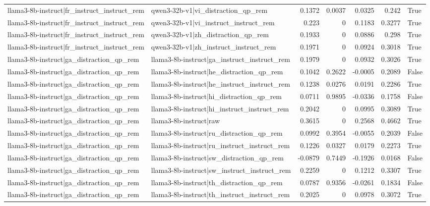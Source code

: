 \begin{table}
\begin{tabular}{l l r r r r l}
llama3-8b-instruct|fr_instruct_instruct_rem & qwen3-32b-v1|vi_distraction_qp_rem & 0.1372 & 0.0037 & 0.0325 & 0.242 & True \\
llama3-8b-instruct|fr_instruct_instruct_rem & qwen3-32b-v1|vi_instruct_instruct_rem & 0.223 & 0 & 0.1183 & 0.3277 & True \\
llama3-8b-instruct|fr_instruct_instruct_rem & qwen3-32b-v1|zh_distraction_qp_rem & 0.1933 & 0 & 0.0886 & 0.298 & True \\
llama3-8b-instruct|fr_instruct_instruct_rem & qwen3-32b-v1|zh_instruct_instruct_rem & 0.1971 & 0 & 0.0924 & 0.3018 & True \\
llama3-8b-instruct|ga_distraction_qp_rem & llama3-8b-instruct|ga_instruct_instruct_rem & 0.1979 & 0 & 0.0932 & 0.3026 & True \\
llama3-8b-instruct|ga_distraction_qp_rem & llama3-8b-instruct|he_distraction_qp_rem & 0.1042 & 0.2622 & -0.0005 & 0.2089 & False \\
llama3-8b-instruct|ga_distraction_qp_rem & llama3-8b-instruct|he_instruct_instruct_rem & 0.1238 & 0.0276 & 0.0191 & 0.2286 & True \\
llama3-8b-instruct|ga_distraction_qp_rem & llama3-8b-instruct|hi_distraction_qp_rem & 0.0711 & 0.9895 & -0.0336 & 0.1758 & False \\
llama3-8b-instruct|ga_distraction_qp_rem & llama3-8b-instruct|hi_instruct_instruct_rem & 0.2042 & 0 & 0.0995 & 0.3089 & True \\
llama3-8b-instruct|ga_distraction_qp_rem & llama3-8b-instruct|raw & 0.3615 & 0 & 0.2568 & 0.4662 & True \\
llama3-8b-instruct|ga_distraction_qp_rem & llama3-8b-instruct|ru_distraction_qp_rem & 0.0992 & 0.3954 & -0.0055 & 0.2039 & False \\
llama3-8b-instruct|ga_distraction_qp_rem & llama3-8b-instruct|ru_instruct_instruct_rem & 0.1226 & 0.0327 & 0.0179 & 0.2273 & True \\
llama3-8b-instruct|ga_distraction_qp_rem & llama3-8b-instruct|sw_distraction_qp_rem & -0.0879 & 0.7449 & -0.1926 & 0.0168 & False \\
llama3-8b-instruct|ga_distraction_qp_rem & llama3-8b-instruct|sw_instruct_instruct_rem & 0.2259 & 0 & 0.1212 & 0.3307 & True \\
llama3-8b-instruct|ga_distraction_qp_rem & llama3-8b-instruct|th_distraction_qp_rem & 0.0787 & 0.9356 & -0.0261 & 0.1834 & False \\
llama3-8b-instruct|ga_distraction_qp_rem & llama3-8b-instruct|th_instruct_instruct_rem & 0.2025 & 0 & 0.0978 & 0.3072 & True \\

\end{tabular}
\end{table}
